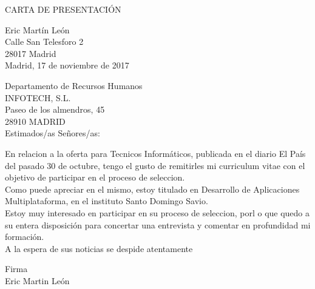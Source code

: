 \documentclass[10pt,a4paper]{article}
\date{sistem}
\begin{document}
\begin{center}
CARTA DE PRESENTACIÓN
\bigskip
\end{center}
\begin{flushright}
Eric Martín León\\
Calle San Telesforo 2\\
28017 Madrid \\

\medskip
Madrid, 17 de noviembre de 2017
\end{flushright}

\begin{flushleft}
Departamento de Recursos Humanos\\
INFOTECH, S.L.\\
Paseo de los almendros, 45\\
28910 MADRID\\
\vspace{2,5cm}
Estimados/as Señores/as: \\
\end{flushleft}

\bigskip

En relacion a la oferta para Tecnicos Informáticos, publicada en el diario El País del pasado 30 de octubre, tengo el gusto de remitirles mi curriculum vitae con el objetivo de participar en el proceso de seleccion.\\ 

Como puede apreciar en el mismo, estoy titulado en Desarrollo de Aplicaciones Multiplataforma, en el instituto Santo Domingo Savio. \\

Estoy muy interesado en participar en su proceso de seleccion, porl o que quedo a su entera disposición para concertar una entrevista y comentar en profundidad mi formación.\\ 

A la espera de sus noticias se despide atentamente \\

\begin{center}
Firma\\ 
\vspace{3cm}
Eric Martin León  
\end{center}
\medskip{}
\end{document}
